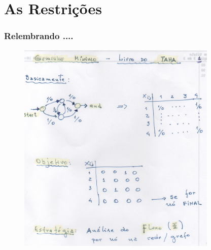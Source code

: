\documentclass{beamer}
\begin{document}

\section{As Restrições}

\begin{frame}
	\frametitle{Relembrando ....}
	
	\begin{figure}[ht!]
		\centering
		\includegraphics[width=0.85\textwidth , height=0.8\textheight]{11_revisa_CAM_MIN.pdf}
	\end{figure}
	
\end{frame}
\end{document}
